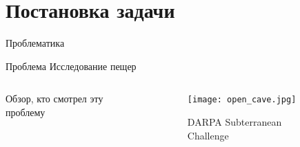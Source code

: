 \section{Постановка задачи}

\begin{frame}[t]{Проблематика}
    \begin{block}{Проблема}
        Исследование пещер
    \end{block}
    \begin{columns}[T,onlytextwidth]
        \begin{column}{0.59\textwidth}
            Обзор, кто смотрел эту проблему
        \end{column}
        \begin{column}{0.39\textwidth}
            \begin{figure}[H]
                \centering\texttt{[image: open\_cave.jpg]}
                \caption*{DARPA Subterranean Challenge}
            \end{figure}
        \end{column}
    \end{columns}
\end{frame}

